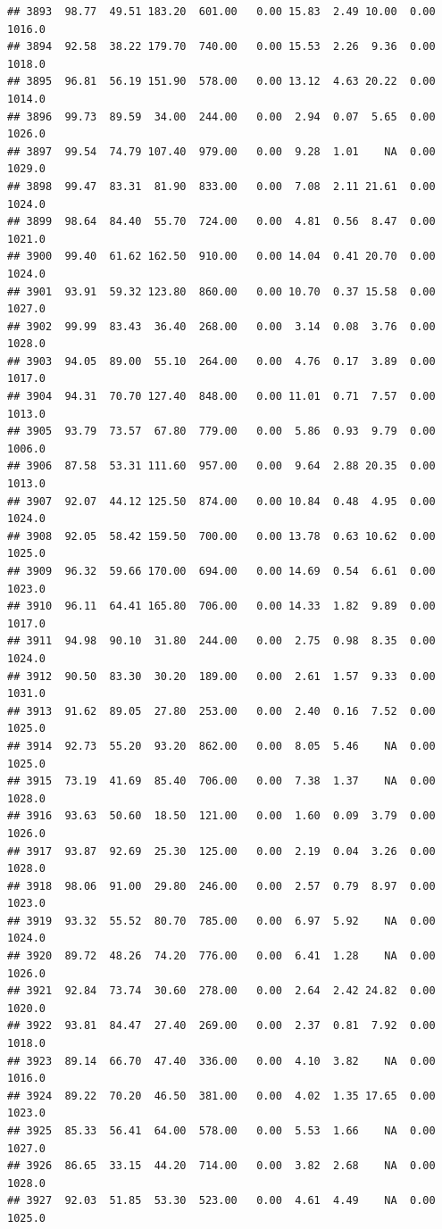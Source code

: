 \documentclass{article}\usepackage{graphicx, color}
\makeatletter
\newenvironment{kframe}{%
 \def\at@end@of@kframe{}%
 \ifinner\ifhmode%
  \def\at@end@of@kframe{\end{minipage}}%
  \begin{minipage}{\columnwidth}%
 \fi\fi%
 \def\FrameCommand##1{\hskip\@totalleftmargin \hskip-\fboxsep
 \colorbox{shadecolor}{##1}\hskip-\fboxsep
     \hskip-\linewidth \hskip-\@totalleftmargin \hskip\columnwidth}%
 \MakeFramed {\advance\hsize-\width
   \@totalleftmargin\z@ \linewidth\hsize
   \@setminipage}}%
 {\par\unskip\endMakeFramed%
 \at@end@of@kframe}
\newenvironment{knitrout}{}{} %
\makeatother
\begin{document}
\begin{knitrout}
\begin{kframe}
\begin{verbatim}
## 3893  98.77  49.51 183.20  601.00   0.00 15.83  2.49 10.00  0.00 1016.0
## 3894  92.58  38.22 179.70  740.00   0.00 15.53  2.26  9.36  0.00 1018.0
## 3895  96.81  56.19 151.90  578.00   0.00 13.12  4.63 20.22  0.00 1014.0
## 3896  99.73  89.59  34.00  244.00   0.00  2.94  0.07  5.65  0.00 1026.0
## 3897  99.54  74.79 107.40  979.00   0.00  9.28  1.01    NA  0.00 1029.0
## 3898  99.47  83.31  81.90  833.00   0.00  7.08  2.11 21.61  0.00 1024.0
## 3899  98.64  84.40  55.70  724.00   0.00  4.81  0.56  8.47  0.00 1021.0
## 3900  99.40  61.62 162.50  910.00   0.00 14.04  0.41 20.70  0.00 1024.0
## 3901  93.91  59.32 123.80  860.00   0.00 10.70  0.37 15.58  0.00 1027.0
## 3902  99.99  83.43  36.40  268.00   0.00  3.14  0.08  3.76  0.00 1028.0
## 3903  94.05  89.00  55.10  264.00   0.00  4.76  0.17  3.89  0.00 1017.0
## 3904  94.31  70.70 127.40  848.00   0.00 11.01  0.71  7.57  0.00 1013.0
## 3905  93.79  73.57  67.80  779.00   0.00  5.86  0.93  9.79  0.00 1006.0
## 3906  87.58  53.31 111.60  957.00   0.00  9.64  2.88 20.35  0.00 1013.0
## 3907  92.07  44.12 125.50  874.00   0.00 10.84  0.48  4.95  0.00 1024.0
## 3908  92.05  58.42 159.50  700.00   0.00 13.78  0.63 10.62  0.00 1025.0
## 3909  96.32  59.66 170.00  694.00   0.00 14.69  0.54  6.61  0.00 1023.0
## 3910  96.11  64.41 165.80  706.00   0.00 14.33  1.82  9.89  0.00 1017.0
## 3911  94.98  90.10  31.80  244.00   0.00  2.75  0.98  8.35  0.00 1024.0
## 3912  90.50  83.30  30.20  189.00   0.00  2.61  1.57  9.33  0.00 1031.0
## 3913  91.62  89.05  27.80  253.00   0.00  2.40  0.16  7.52  0.00 1025.0
## 3914  92.73  55.20  93.20  862.00   0.00  8.05  5.46    NA  0.00 1025.0
## 3915  73.19  41.69  85.40  706.00   0.00  7.38  1.37    NA  0.00 1028.0
## 3916  93.63  50.60  18.50  121.00   0.00  1.60  0.09  3.79  0.00 1026.0
## 3917  93.87  92.69  25.30  125.00   0.00  2.19  0.04  3.26  0.00 1028.0
## 3918  98.06  91.00  29.80  246.00   0.00  2.57  0.79  8.97  0.00 1023.0
## 3919  93.32  55.52  80.70  785.00   0.00  6.97  5.92    NA  0.00 1024.0
## 3920  89.72  48.26  74.20  776.00   0.00  6.41  1.28    NA  0.00 1026.0
## 3921  92.84  73.74  30.60  278.00   0.00  2.64  2.42 24.82  0.00 1020.0
## 3922  93.81  84.47  27.40  269.00   0.00  2.37  0.81  7.92  0.00 1018.0
## 3923  89.14  66.70  47.40  336.00   0.00  4.10  3.82    NA  0.00 1016.0
## 3924  89.22  70.20  46.50  381.00   0.00  4.02  1.35 17.65  0.00 1023.0
## 3925  85.33  56.41  64.00  578.00   0.00  5.53  1.66    NA  0.00 1027.0
## 3926  86.65  33.15  44.20  714.00   0.00  3.82  2.68    NA  0.00 1028.0
## 3927  92.03  51.85  53.30  523.00   0.00  4.61  4.49    NA  0.00 1025.0

\end{verbatim}
\end{kframe}
\end{knitrout}
\end{document}
